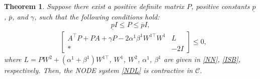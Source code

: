 \documentclass[journal,twoside,web]{ieeecolor}
\newtheorem{theorem}            {Theorem}[section]
\begin{document}
\begin{theorem}\label{CO0}
Suppose there exist a positive definite matrix $P$, positive constants $\underline{p}$, $\overline{p}$, and $\gamma$, such that the following conditions hold: 
\begin{equation}\label{TH110}
 \underline{p}I\leq P\leq \overline{p}I, 
\end{equation}
\begin{equation}\label{TH120}
\begin{aligned}
&\begin{bmatrix}
A^\top P+PA+\gamma P-2\alpha^1\beta^1W^{1\top}W^1 &L\\\ast
 & -2I
\end{bmatrix}\leq 0,
\end{aligned}
\end{equation}
where $L=PW^2+(\alpha^1+\beta^1)W^{1\top}$, $W^1$, $W^2$, $\alpha^1$, $\beta^1$ are given in \eqref{NN}, \eqref{ISB}, respectively. Then, the NODE system \eqref{NDL} is contractive in $\mathcal{C}$.
\end{theorem}
\end{document}

